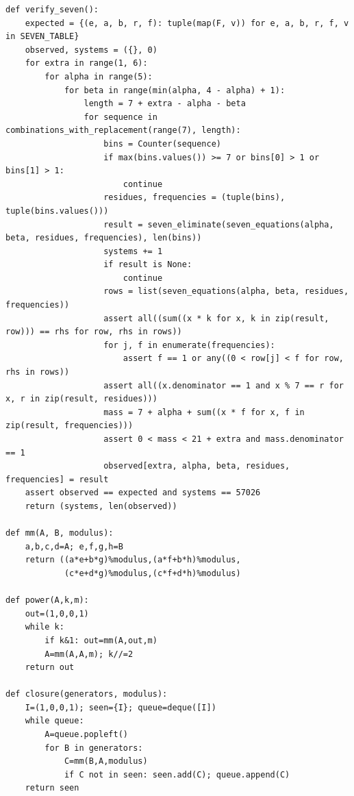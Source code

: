 \documentclass[11pt,a4paper]{article}
\theoremstyle{definition}
\numberwithin{equation}{section}
\begin{document}
\begin{Verbatim}[fontsize=\scriptsize]
def verify_seven():
    expected = {(e, a, b, r, f): tuple(map(F, v)) for e, a, b, r, f, v in SEVEN_TABLE}
    observed, systems = ({}, 0)
    for extra in range(1, 6):
        for alpha in range(5):
            for beta in range(min(alpha, 4 - alpha) + 1):
                length = 7 + extra - alpha - beta
                for sequence in combinations_with_replacement(range(7), length):
                    bins = Counter(sequence)
                    if max(bins.values()) >= 7 or bins[0] > 1 or bins[1] > 1:
                        continue
                    residues, frequencies = (tuple(bins), tuple(bins.values()))
                    result = seven_eliminate(seven_equations(alpha, beta, residues, frequencies), len(bins))
                    systems += 1
                    if result is None:
                        continue
                    rows = list(seven_equations(alpha, beta, residues, frequencies))
                    assert all((sum((x * k for x, k in zip(result, row))) == rhs for row, rhs in rows))
                    for j, f in enumerate(frequencies):
                        assert f == 1 or any((0 < row[j] < f for row, rhs in rows))
                    assert all((x.denominator == 1 and x % 7 == r for x, r in zip(result, residues)))
                    mass = 7 + alpha + sum((x * f for x, f in zip(result, frequencies)))
                    assert 0 < mass < 21 + extra and mass.denominator == 1
                    observed[extra, alpha, beta, residues, frequencies] = result
    assert observed == expected and systems == 57026
    return (systems, len(observed))

def mm(A, B, modulus):
    a,b,c,d=A; e,f,g,h=B
    return ((a*e+b*g)%modulus,(a*f+b*h)%modulus,
            (c*e+d*g)%modulus,(c*f+d*h)%modulus)

def power(A,k,m):
    out=(1,0,0,1)
    while k:
        if k&1: out=mm(A,out,m)
        A=mm(A,A,m); k//=2
    return out

def closure(generators, modulus):
    I=(1,0,0,1); seen={I}; queue=deque([I])
    while queue:
        A=queue.popleft()
        for B in generators:
            C=mm(B,A,modulus)
            if C not in seen: seen.add(C); queue.append(C)
    return seen


\end{Verbatim}
\end{document}
